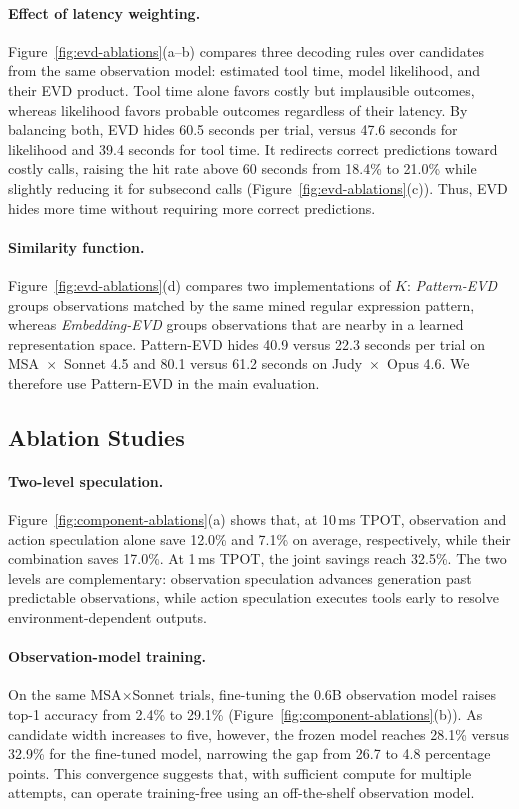\paragraph{Effect of latency weighting.}
Figure~\ref{fig:evd-ablations}(a--b) compares three decoding rules over
candidates from the same observation model: estimated tool time, model
likelihood, and their EVD product. Tool time alone favors costly but
implausible outcomes, whereas likelihood favors probable outcomes regardless
of their latency. By balancing both, EVD hides 60.5 seconds per trial, versus
47.6 seconds for likelihood and 39.4 seconds for tool time.
It redirects correct predictions toward
costly calls, raising the hit rate above 60 seconds from 18.4\% to
21.0\% while slightly reducing it for subsecond calls
(Figure~\ref{fig:evd-ablations}(c)). Thus, EVD hides more time without
requiring more correct predictions.

\paragraph{Similarity function.}
Figure~\ref{fig:evd-ablations}(d) compares two implementations of $K$:
\emph{Pattern-EVD} groups observations matched by the same mined regular
expression pattern, whereas \emph{Embedding-EVD} groups observations that are
nearby in a learned representation space. Pattern-EVD hides 40.9 versus 22.3
seconds per trial on MSA~$\times$~Sonnet 4.5 and 80.1 versus 61.2 seconds on
Judy~$\times$~Opus 4.6. We therefore use Pattern-EVD in the main evaluation.

\subsection{Ablation Studies}

\paragraph{Two-level speculation.}
Figure~\ref{fig:component-ablations}(a) shows that, at 10\,ms TPOT,
observation and action speculation alone save 12.0\% and 7.1\% on average,
respectively, while their combination saves 17.0\%. At 1\,ms TPOT, the joint
savings reach 32.5\%. The two levels are complementary: observation
speculation advances generation past predictable observations, while action
speculation executes tools early to resolve environment-dependent outputs.

\paragraph{Observation-model training.}
On the same MSA$\times$Sonnet trials, fine-tuning the 0.6B observation model
raises top-1 accuracy from 2.4\% to 29.1\%
(Figure~\ref{fig:component-ablations}(b)). 
As candidate width increases to
five, however, the frozen model reaches 28.1\% versus 32.9\% for the
fine-tuned model, narrowing the gap from 26.7 to 4.8 percentage points. 
This convergence suggests that, with sufficient compute for multiple attempts, \sysname{} can operate training-free using an off-the-shelf observation model.

